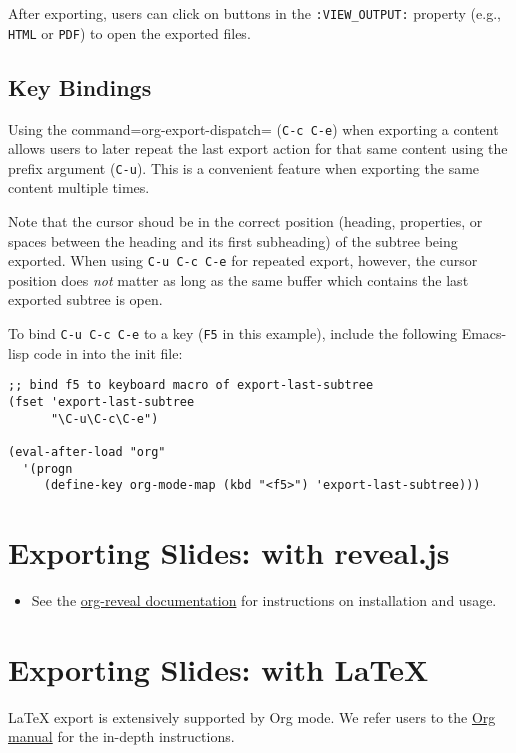 \documentclass[10pt,article]{article}
\begin{document}
After exporting, users can click on buttons in the \texttt{:VIEW\_OUTPUT:}
property (e.g., \texttt{HTML} or \texttt{PDF}) to open the exported files.

\subsection{Key Bindings}
\label{sec:org527b020}
Using the command=org-export-dispatch= (\texttt{C-c C-e}) when exporting a
content allows users to later repeat the last export action for that
same content using the prefix argument (\texttt{C-u}). This is a convenient
feature when exporting the same content multiple times.

\vspace{5 mm}

\begin{mdframed}
Note that the cursor shoud be in the correct position (heading,
properties, or spaces between the heading and its first subheading) of
the subtree being exported. When using \texttt{C-u C-c C-e} for repeated
export, however, the cursor position does \emph{not} matter as long as the
same buffer which contains the last exported subtree is open.
\end{mdframed}

\vspace{5 mm}

To bind \texttt{C-u C-c C-e} to a key (\texttt{F5} in this example), include
the following Emacs-lisp code in into the init file:

\begin{verbatim}
;; bind f5 to keyboard macro of export-last-subtree
(fset 'export-last-subtree
      "\C-u\C-c\C-e")

(eval-after-load "org"
  '(progn
     (define-key org-mode-map (kbd "<f5>") 'export-last-subtree)))
\end{verbatim}
\section{Exporting Slides: with reveal.js}
\label{sec:org4357279}
\begin{itemize}
\item See the \href{https://github.com/yjwen/org-reveal/}{org-reveal documentation} for instructions on installation and usage.
\end{itemize}
\section{Exporting Slides: with \LaTeX{}}
\label{sec:org1144b52}
\LaTeX{} export is extensively supported by Org mode. We refer users to the \href{https://orgmode.org/manual/LaTeX-export.html\#LaTeX-export}{Org
manual} for the in-depth instructions.
\end{document}
